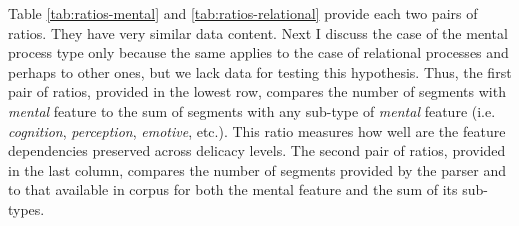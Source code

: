    \begin{table}[!ht]
    \noindent
    \end{table}
    
    Table \ref{tab:ratios-mental} and \ref{tab:ratios-relational} provide each two pairs of ratios. They have very similar data content. Next I discuss the case of the mental process type only because the same applies to the case of relational processes and perhaps to other ones, but we lack data for testing this hypothesis. Thus, the first pair of ratios, provided in the lowest row, compares the number of segments with \textit{mental} feature to the sum of segments with any sub-type of \textit{mental} feature (i.e.  \textit{cognition}, \textit{perception}, \textit{emotive}, etc.). This ratio measures how well are the feature dependencies preserved across delicacy levels. The second pair of ratios, provided in the last column, compares the number of segments provided by the parser and to that available in corpus for both the mental feature and the sum of its sub-types.
    
